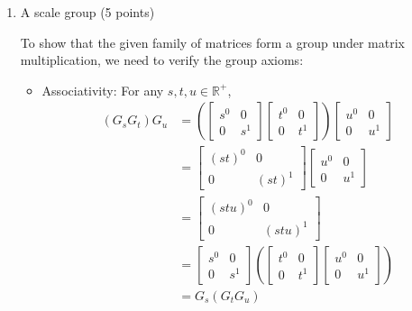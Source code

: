 \documentclass{article}
\begin{document}
\begin{enumerate}
\item A scale group (5 points)

To show that the given family of matrices form a group under matrix multiplication, we need to verify the group axioms:

\begin{itemize}
\item Associativity: For any $s, t, u \in \mathbb{R}^+$,
\begin{align*}
(G_s G_t) G_u &= \left(\begin{bmatrix} s^0 & 0 \\ 0 & s^1 \end{bmatrix} \begin{bmatrix} t^0 & 0 \\ 0 & t^1 \end{bmatrix}\right) \begin{bmatrix} u^0 & 0 \\ 0 & u^1 \end{bmatrix} \\
&= \begin{bmatrix} (st)^0 & 0 \\ 0 & (st)^1 \end{bmatrix} \begin{bmatrix} u^0 & 0 \\ 0 & u^1 \end{bmatrix} \\
&= \begin{bmatrix} (stu)^0 & 0 \\ 0 & (stu)^1 \end{bmatrix} \\
&= \begin{bmatrix} s^0 & 0 \\ 0 & s^1 \end{bmatrix} \left(\begin{bmatrix} t^0 & 0 \\ 0 & t^1 \end{bmatrix} \begin{bmatrix} u^0 & 0 \\ 0 & u^1 \end{bmatrix}\right) \\
&= G_s (G_t G_u)
\end{align*}


\end{itemize}
\end{enumerate}
\end{document}
